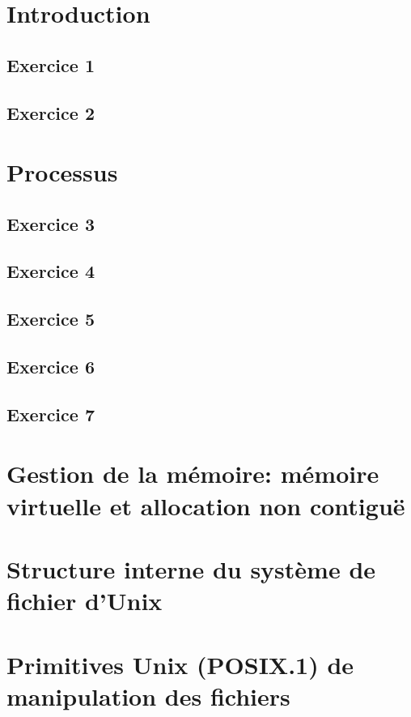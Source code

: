 \documentclass[12pt,a4paper,openany]{book}
\begin{document}
	\setcounter{tocdepth}{2}
	\setcounter{secnumdepth}{3}
	\maketitle
	\tableofcontents
	\chapter{Introduction}
		\section{Exercice 1}
		
		
		\section{Exercice 2}
		
		
	\chapter{Processus}
		\section{Exercice 3}
		\section{Exercice 4}
		\section{Exercice 5}
		\section{Exercice 6}
		\section{Exercice 7}
	\chapter{Gestion de la mémoire: mémoire virtuelle et allocation non contiguë}
	\chapter{Structure interne du système de fichier d'Unix}
	\chapter{Primitives Unix (POSIX.1) de manipulation des fichiers}
\end{document}
